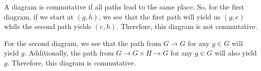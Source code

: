 \documentclass[12pt]{report}
\begin{document}
\sol A diagram is commutative if all paths lead to the same place. So, for the first diagram, if we start at $(g, h)$, we see that the first path will yield us $(g, e)$ while the second path yields $(e, h)$. Therefore, this diagram is not commutative.

For the second diagram, we see that the path from $G \to G$ for any $g \in G$ will yield $g$. Additionally, the path from $G \to G \times H \to G$ for any $g \in G$ will also yield $g$. Therefore, this diagram is commutative.
\end{document}
